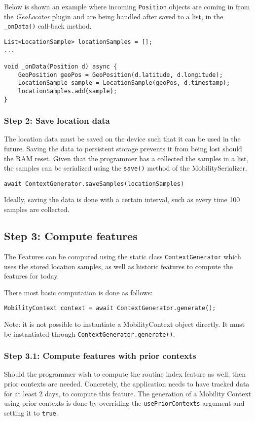 Below is shown an example where incoming \verb|Position| objects are coming in from the \textit{GeoLocator} plugin and are being handled after saved to a list, in the \verb|_onData()| call-back method.

\begin{verbatim}
List<LocationSample> locationSamples = [];
...

void _onData(Position d) async {
    GeoPosition geoPos = GeoPosition(d.latitude, d.longitude);
    LocationSample sample = LocationSample(geoPos, d.timestamp);
    locationSamples.add(sample);
}
\end{verbatim}

\subsubsection*{Step 2: Save location data}
The location data must be saved on the device such that it can be used in the future. Saving the data to persistent storage prevents it from being lost should the RAM reset. Given that the programmer has a collected the samples in a list, the samples can be serialized using the \verb|save()| method of the MobilitySerializer.

\begin{verbatim}
await ContextGenerator.saveSamples(locationSamples)
\end{verbatim}

Ideally, saving the data is done with a certain interval, such as every time 100 samples are collected. 

\subsection*{Step 3: Compute features}
The Features can be computed using the static class \verb|ContextGenerator| which uses the stored location samples, as well as historic features to compute the features for today.

There most basic computation is done as follows:
\begin{verbatim}
MobilityContext context = await ContextGenerator.generate();
\end{verbatim}

Note: it is not possible to instantiate a MobilityContext object directly. 
It must be instantiated through \verb|ContextGenerator.generate()|.

\subsubsection*{Step 3.1: Compute features with prior contexts}
Should the programmer wish to compute the routine index feature as well, then prior contexts are needed. Concretely, the application needs to have tracked data for at least 2 days, to compute this feature. The generation of a Mobility Context using prior contexts is done by overriding the \verb|usePriorContexts| argument and setting it to \verb|true|.


